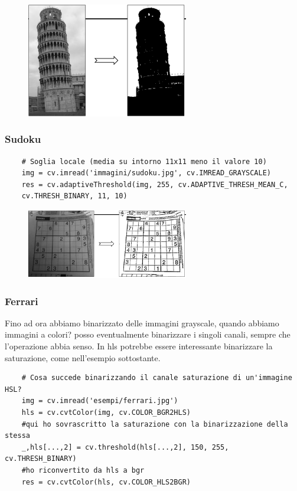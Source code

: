 \begin{figure}[htp]
	\includegraphics[width=200pt]{./immagini/torre_binarizzata.png}
	\label{img:torre_binarizzata}
\end{figure}

\subsubsection{Sudoku}

\begin{lstlisting}
	# Soglia locale (media su intorno 11x11 meno il valore 10)
	img = cv.imread('immagini/sudoku.jpg', cv.IMREAD_GRAYSCALE)
	res = cv.adaptiveThreshold(img, 255, cv.ADAPTIVE_THRESH_MEAN_C,
	cv.THRESH_BINARY, 11, 10)
\end{lstlisting}

\begin{figure}[htp]
	\includegraphics[width=200pt]{./immagini/sudoku_binarizzato.png}
	\label{img:sudoku_binarizzato}
\end{figure}

\subsubsection{Ferrari}

Fino ad ora abbiamo binarizzato delle immagini grayscale, quando abbiamo immagini a colori? posso eventualmente binarizzare i singoli canali, sempre che l'operazione abbia senso. In hls potrebbe essere interessante binarizzare la saturazione, come nell'esempio sottostante.

\begin{lstlisting}
	# Cosa succede binarizzando il canale saturazione di un'immagine HSL?
	img = cv.imread('esempi/ferrari.jpg')
	hls = cv.cvtColor(img, cv.COLOR_BGR2HLS)
	#qui ho sovrascritto la saturazione con la binarizzazione della stessa
	_,hls[...,2] = cv.threshold(hls[...,2], 150, 255, cv.THRESH_BINARY)
	#ho riconvertito da hls a bgr
	res = cv.cvtColor(hls, cv.COLOR_HLS2BGR)
\end{lstlisting}

